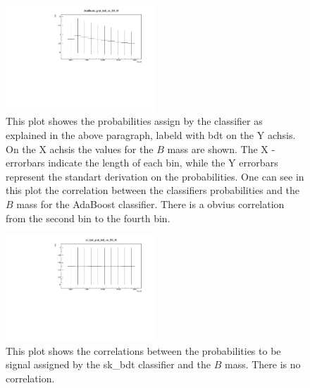 \documentclass[english]{uzhpub}
\begin{document}

 \begin{figure}[H]
  \centering
  \includegraphics[width=0.5\textwidth]{plots/AdaBoost_plot_bdt_vs_B0_M}
  \caption{This plot showes the probabilities assign by the classifier as explained in the above paragraph, labeld with bdt on the Y achsis. On the X achsis the values for the $B$ mass are shown. The X - errorbars indicate the length of each bin, while the Y errorbars represent the standart derivation on the probabilities. One can see in this plot the correlation between the classifiers probabilities and the $B$ mass for the AdaBoost classifier. There is a obvius correlation from the second bin to the fourth bin.}
  \label{fig:AdaB0M}
 \end{figure}

 \begin{figure}[H]
  \centering
  \includegraphics[width=0.5\textwidth]{plots/sk_bdt_plot_bdt_vs_B0_M}
  \caption{This plot shows the correlations between the probabilities to be signal assigned by the sk\_bdt classifier and the $B$ mass. There is no correlation.}
  \label{fig:skbdtB0M}
 \end{figure}
\end{document}
